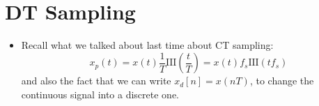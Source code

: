 \section{DT Sampling}
\begin{itemize}
	\item Recall what we talked about last time about CT sampling:
		\[
		x_p(t) = x(t) \frac{1}{T}\text{III}\left( \frac{t}{T} \right)  = x(t) f_s \text{III}(tf_s)
		\] 
		and also the fact that we can write \( x_d[n] = x(nT) \), to change the continuous signal into 
		a discrete one. 
\end{itemize}
